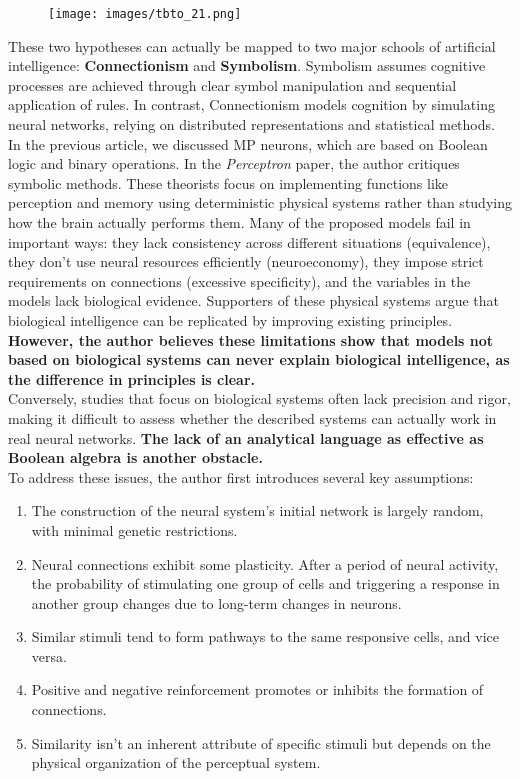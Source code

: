 \documentclass[11p,oneside]{book}
\begin{document}
\begin{figure}[H]
    \centering
    \texttt{[image: images/tbto\_21.png]}
\end{figure}

These two hypotheses can actually be mapped to two major schools of artificial intelligence: \textbf{Connectionism} and \textbf{Symbolism}. Symbolism assumes cognitive processes are achieved through clear symbol manipulation and sequential application of rules. In contrast, Connectionism models cognition by simulating neural networks, relying on distributed representations and statistical methods. \\

In the previous article, we discussed MP neurons, which are based on Boolean logic and binary operations. In the \textit{Perceptron} paper, the author critiques symbolic methods. These theorists focus on implementing functions like perception and memory using deterministic physical systems rather than studying how the brain actually performs them. Many of the proposed models fail in important ways: they lack consistency across different situations (equivalence), they don’t use neural resources efficiently (neuroeconomy), they impose strict requirements on connections (excessive specificity), and the variables in the models lack biological evidence. Supporters of these physical systems argue that biological intelligence can be replicated by improving existing principles. \textbf{However, the author believes these limitations show that models not based on biological systems can never explain biological intelligence, as the difference in principles is clear.} \\

Conversely, studies that focus on biological systems often lack precision and rigor, making it difficult to assess whether the described systems can actually work in real neural networks. \textbf{The lack of an analytical language as effective as Boolean algebra is another obstacle.} \\

To address these issues, the author first introduces several key assumptions:
\begin{enumerate}
    \item The construction of the neural system’s initial network is largely random, with minimal genetic restrictions.
    \item Neural connections exhibit some plasticity. After a period of neural activity, the probability of stimulating one group of cells and triggering a response in another group changes due to long-term changes in neurons.
    \item Similar stimuli tend to form pathways to the same responsive cells, and vice versa.
    \item Positive and negative reinforcement promotes or inhibits the formation of connections.
    \item Similarity isn’t an inherent attribute of specific stimuli but depends on the physical organization of the perceptual system.
\end{enumerate}
\end{document}
